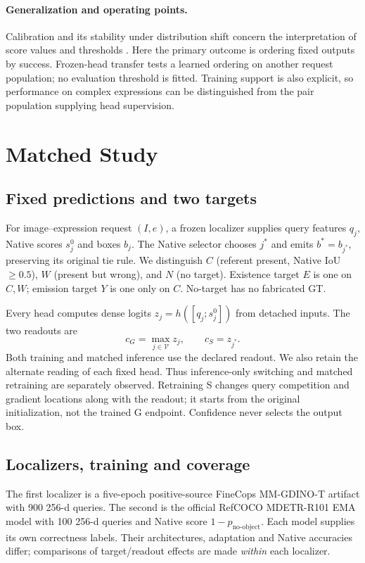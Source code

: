 \documentclass[10pt,twocolumn,letterpaper]{article}
\begin{document}
\paragraph{Generalization and operating points.}
Calibration and its stability under distribution shift concern the
interpretation of score values and thresholds
\cite{guo2017calibration,ovadia2019trust}. Here the primary outcome is
ordering fixed outputs by success. Frozen-head transfer tests a learned
ordering on another request population; no evaluation threshold is fitted.
Training support is also explicit, so performance on complex expressions
can be distinguished from the pair population supplying head supervision.

\section{Matched Study}
\subsection{Fixed predictions and two targets}
For image--expression request $(I,e)$, a frozen localizer supplies query
features $q_j$, Native scores $s_j^0$ and boxes $b_j$. The Native selector
chooses $j^*$ and emits $b^*=b_{j^*}$, preserving its original tie rule.
We distinguish $C$ (referent present, Native IoU $\geq0.5$), $W$ (present
but wrong), and $N$ (no target). Existence target $E$ is one on $C,W$;
emission target $Y$ is one only on $C$. No-target has no fabricated GT.

Every head computes dense logits $z_j=h([q_j;s_j^0])$ from detached
inputs. The two readouts are
\begin{equation}
c_G=\max_{j\in\mathcal V}z_j,\qquad c_S=z_{j^*}.
\end{equation}
Both training and matched inference use the declared readout. We also
retain the alternate reading of each fixed head. Thus inference-only
switching and matched retraining are separately observed. Retraining S
changes query competition and gradient locations along with the readout;
it starts from the original initialization, not the trained G endpoint.
Confidence never selects the output box.

\subsection{Localizers, training and coverage}
The first localizer is a five-epoch positive-source FineCops MM-GDINO-T
artifact with 900 256-d queries. The second is the official RefCOCO
MDETR-R101 EMA model with 100 256-d queries and Native score
$1-p_{\text{no-object}}$. Each model supplies its own correctness labels.
Their architectures, adaptation and Native accuracies differ; comparisons
of target/readout effects are made \emph{within} each localizer.
\end{document}
